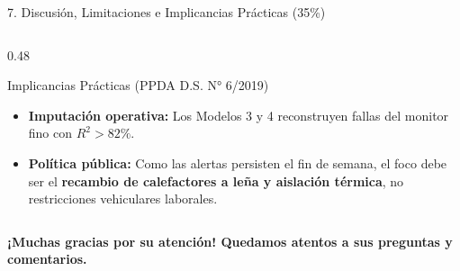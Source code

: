 \documentclass[aspectratio=169, 9pt]{beamer}
\begin{document}
\begin{frame}{7. Discusión, Limitaciones e Implicancias Prácticas (35\%)}
\begin{columns}[T]
\begin{column}{0.48\textwidth}
    \begin{exampleblock}{\footnotesize Implicancias Prácticas (PPDA D.S. N° 6/2019)}
      \scriptsize
      \begin{itemize}\scriptsize\setlength{\itemsep}{1pt}
        \item \textbf{Imputación operativa:} Los Modelos 3 y 4 reconstruyen fallas del monitor fino con $R^2 > 82\%$.
        \item \textbf{Política pública:} Como las alertas persisten el fin de semana, el foco debe ser el \textbf{recambio de calefactores a leña y aislación térmica}, no restricciones vehiculares laborales.
      \end{itemize}
    \end{exampleblock}
  \end{column}
\end{columns}

\vspace{0.10cm}
\centering
{\footnotesize\bfseries\color{UddNavy} ¡Muchas gracias por su atención! Quedamos atentos a sus preguntas y comentarios.}
\end{frame}
\end{document}
